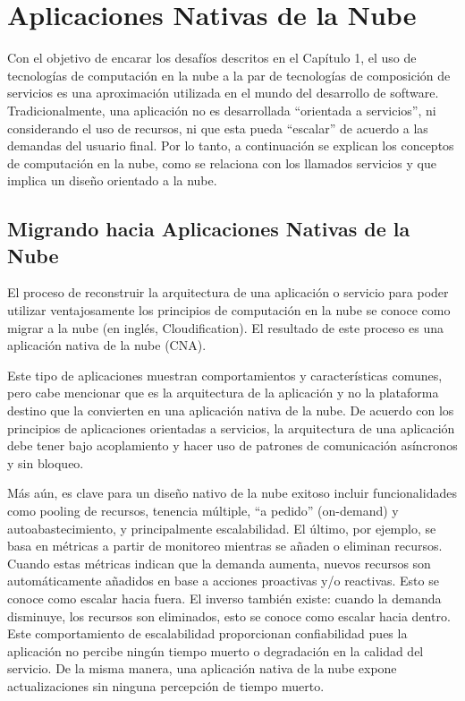 \chapter{Aplicaciones Nativas de la Nube}

    Con el objetivo de encarar los desafíos descritos en el Capítulo 1, el
    uso de tecnologías de computación en la nube a la par de tecnologías de
    composición de servicios es una aproximación utilizada en el mundo del
    desarrollo de software. Tradicionalmente, una aplicación no es
    desarrollada ``orientada a servicios'', ni considerando el uso de
    recursos, ni que esta pueda ``escalar'' de acuerdo a las demandas del
    usuario final. Por lo tanto, a continuación se explican los conceptos de
    computación en la nube, como se relaciona con los llamados servicios y
    que implica un diseño orientado a la nube.

    
	\section{Migrando hacia Aplicaciones Nativas de la Nube}
	
    El proceso de reconstruir la arquitectura de una aplicación o servicio para poder utilizar ventajosamente los principios de computación en la nube se conoce como migrar a la nube (en inglés, Cloudification). El resultado de este proceso es una aplicación nativa de la nube (CNA). 
    
    Este tipo de aplicaciones muestran comportamientos y características comunes, pero cabe mencionar que es la arquitectura de la aplicación y no la plataforma destino que la convierten en una aplicación nativa de la nube. De acuerdo con los principios de aplicaciones orientadas a servicios, la arquitectura de una aplicación debe tener bajo acoplamiento y hacer uso de patrones de comunicación asíncronos y sin bloqueo. 
    
    Más aún, es clave para un diseño nativo de la nube exitoso incluir funcionalidades como pooling de recursos, tenencia múltiple, “a pedido” (on-demand) y autoabastecimiento, y principalmente escalabilidad. El último, por ejemplo, se basa en métricas a partir de monitoreo mientras se añaden o eliminan recursos. Cuando estas métricas indican que la demanda aumenta, nuevos recursos son automáticamente añadidos en base a acciones proactivas y/o reactivas. Esto se conoce como escalar hacia fuera. El inverso también existe: cuando la demanda disminuye, los recursos son eliminados, esto se conoce como escalar hacia dentro. Este comportamiento de escalabilidad proporcionan confiabilidad pues la aplicación no percibe ningún tiempo muerto o degradación en la calidad del servicio. De la misma manera, una aplicación nativa de la nube expone actualizaciones sin ninguna percepción de tiempo muerto. 
    
